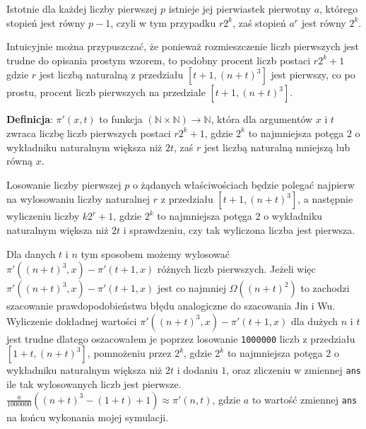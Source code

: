 \documentclass{article}
\begin{document}
Istotnie dla każdej liczby pierwszej $p$ istnieje jej pierwiastek pierwotny $a$,
którego stopień jest równy $p-1$, czyli w tym przypadku $r2^k$, zaś stopień $a^r$ jest równy $2^k$.


Intuicyjnie można przypuszczać, że ponieważ rozmieszczenie liczb pierwszych jest trudne 
do opisania prostym wzorem, to podobny procent liczb postaci $r2^k+1$ gdzie $r$ jest liczbą
naturalną z przedziału $[t+1,(n+t)^3]$ jest pierwszy, co po prostu, procent liczb 
pierwszych na przedziale $[t+1,(n+t)^3]$. 

\begin{tcolorbox}
    \textbf{Definicja}: $\pi'(x,t)$ to funkcja $(\mathbb{N} \times \mathbb{N}) \to \mathbb{N}$, która dla argumentów $x$ i
    $t$ zwraca liczbę liczb pierwszych postaci $r2^k+1$, gdzie $2^k$ to najmniejsza potęga $2$ o wykładniku naturalnym
    większa niż $2t$, zaś $r$ jest liczbą naturalną mniejszą lub równą $x$.
\end{tcolorbox}

Losowanie liczby pierwszej $p$ o żądanych właściwościach będzie polegać najpierw na wylosowaniu liczby naturalnej $r$
z przedziału $[t+1,(n+t)^3]$, a następnie wyliczeniu liczby $k2^r+1$, gdzie $2^k$ to najmniejsza potęga $2$ o wykładniku naturalnym większa niż $2t$ i sprawdzeniu, czy 
tak wyliczona liczba jest pierwsza.

Dla danych $t$ i $n$ tym sposobem możemy wylosować $\pi'((n+t)^3,x)-\pi'(t+1,x)$ różnych liczb pierwszych. Jeżeli 
więc $\pi'((n+t)^3,x)-\pi'(t+1,x)$ jest co najmniej $\Omega((n+t)^2)$ to zachodzi szacowanie prawdopodobieństwa błędu analogiczne do szacowania 
Jin i Wu. Wyliczenie dokładnej wartości $\pi'((n+t)^3,x)-\pi'(t+1,x)$ dla dużych $n$ i $t$ jest trudne 
dlatego oszacowałem je poprzez losowanie \texttt{1000000} liczb z przedziału $[1+t,(n+t)^3]$, pomnożeniu przez $2^k$, gdzie $2^k$ to najmniejsza potęga $2$ o wykładniku naturalnym
większa niż $2t$ i dodaniu $1$, oraz zliczeniu w zmiennej \texttt{ans} ile tak wylosowanych liczb jest pierwsze. 
$\frac{a}{1000000}((n+t)^3-(1+t)+1) \approx \pi'(n,t)$, gdzie $a$ to wartość zmiennej \texttt{ans} na końcu wykonania mojej symulacji.
\end{document}
